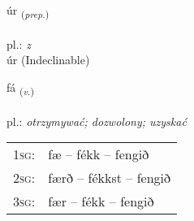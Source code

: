 \documentclass[frontgrid, backgrid]{flacards}\usepackage[]{graphicx}\usepackage[]{xcolor}
\begin{document}
\renewcommand{\blhead}{\vskip5pt {\small\bfseries\footnotesize Forsetning | przyimek }}
\renewcommand{\bcfoot}{\vskip5pt \hspace{2pt}{\small\bfseries\footnotesize 1K}}


{úr \small{\textsubscript{(\textit{prep.})}} \\[1ex]
\textphonetic{[uːr]} \\
pl.: \emph{z} \\  [2ex]
úr (Indeclinable)}

\renewcommand{\flhead}{\vskip5pt \fboxsep=0pt {\small\bfseries\footnotesize Sagnorð | czasownik}}
\renewcommand{\fcfoot}{\vskip5pt \fboxsep=0pt \hspace{2pt}{\small\bfseries\footnotesize 1K}}

\renewcommand{\blhead}{\vskip5pt {\small\bfseries\footnotesize Sagnorð | czasownik }}
\renewcommand{\bcfoot}{\vskip5pt \hspace{2pt}{\small\bfseries\footnotesize 1K}}


{fá \small{\textsubscript{(\textit{v.})}} \\[1ex] %
\textphonetic{[fauː]} \\
pl.: \emph{otrzymywać; dozwolony; uzyskać} \\  [2ex]
\renewcommand*{\arraystretch}{0.8}
\begin{tabular}{p{1cm}l}
\textsc{1sg}: & fæ -- fékk -- fengið \\ 
\textsc{2sg}: & færð -- fékkst -- fengið \\ 
\textsc{3sg}: & fær -- fékk -- fengið \\ 
\end{tabular}
}


\renewcommand{\flhead}{\vskip5pt \fboxsep=0pt {\small\bfseries\footnotesize Forsetning | przyimek}}
\renewcommand{\fcfoot}{\vskip5pt \fboxsep=0pt \hspace{2pt}{\small\bfseries\footnotesize 1K}}

\renewcommand{\blhead}{\vskip5pt {\small\bfseries\footnotesize Forsetning | przyimek }}
\renewcommand{\bcfoot}{\vskip5pt \hspace{2pt}{\small\bfseries\footnotesize 1K}}
\end{document}
